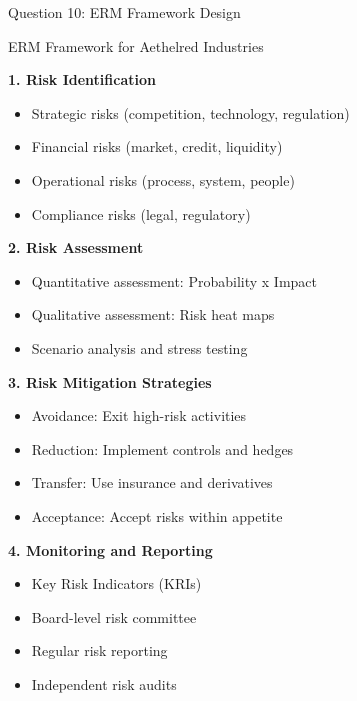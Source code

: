 \documentclass[aspectratio=169]{beamer}
\newcommand{\subquestion}[1]{{\bfseries\color{darkgreen}#1}}
\begin{document}
	\begin{frame}{Question 10: ERM Framework Design}
		
		\begin{block}{ERM Framework for Aethelred Industries}
			
			\subquestion{1. Risk Identification}
			\begin{itemize}
				\item Strategic risks (competition, technology, regulation)
				\item Financial risks (market, credit, liquidity)
				\item Operational risks (process, system, people)
				\item Compliance risks (legal, regulatory)
			\end{itemize}
			
			\subquestion{2. Risk Assessment}
			\begin{itemize}
				\item Quantitative assessment: Probability x Impact
				\item Qualitative assessment: Risk heat maps
				\item Scenario analysis and stress testing
			\end{itemize}
			
			\subquestion{3. Risk Mitigation Strategies}
			\begin{itemize}
				\item Avoidance: Exit high-risk activities
				\item Reduction: Implement controls and hedges
				\item Transfer: Use insurance and derivatives
				\item Acceptance: Accept risks within appetite
			\end{itemize}
			
			\subquestion{4. Monitoring and Reporting}
			\begin{itemize}
				\item Key Risk Indicators (KRIs)
				\item Board-level risk committee
				\item Regular risk reporting
				\item Independent risk audits
			\end{itemize}
		\end{block}
	\end{frame}
	
\end{document}

